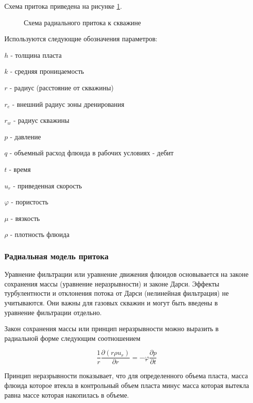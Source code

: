 Схема притока приведена на рисунке \ref{ris:radial_inflow_scheme}.

\begin{figure}[h!]
	\begin{center}
		
		\caption{Схема радиального притока к скважине}
		\label{ris:radial_inflow_scheme}
	\end{center}
\end{figure}

Используются следующие обозначения параметров:

\(h\) - толщина пласта

\(k\) - средняя проницаемость

\(r\) - радиус (расстояние от скважины)

\(r_e\) -  внешний радиус зоны дренирования

\(r_w\) - радиус скважины

\(p\) - давление

\(q\) - объемный расход флюида в рабочих условиях - дебит

\(t\) - время

\(u_r\) - приведенная скорость

\(\varphi\) -  пористость

\(\mu\) - вязкость

\(\rho\) - плотность флюида

\subsubsection{Радиальная модель притока}
Уравнение фильтрации или уравнение движения флюидов основывается на законе сохранения массы (уравнение неразрывности) и законе Дарси.  Эффекты турбулентности и отклонения потока от Дарси (нелинейная фильтрация) не учитываются. Они важны для газовых скважин и могут быть введены в уравнение фильтрации отдельно. 

Закон сохранения массы или принцип неразрывности можно выразить в радиальной форме следующим соотношением

\begin{equation} \label{eq:mass_balance_2}
\frac{1}{r}\frac{\partial\left(r\rho u_r\right)}{\partial r}=-\varphi\frac{\partial p}{\partial t}
\end{equation}

Принцип неразрывности показывает, что для определенного объема пласта, масса флюида которое втекла в контрольный объем пласта минус масса которая вытекла равна массе которая накопилась в объеме. 

